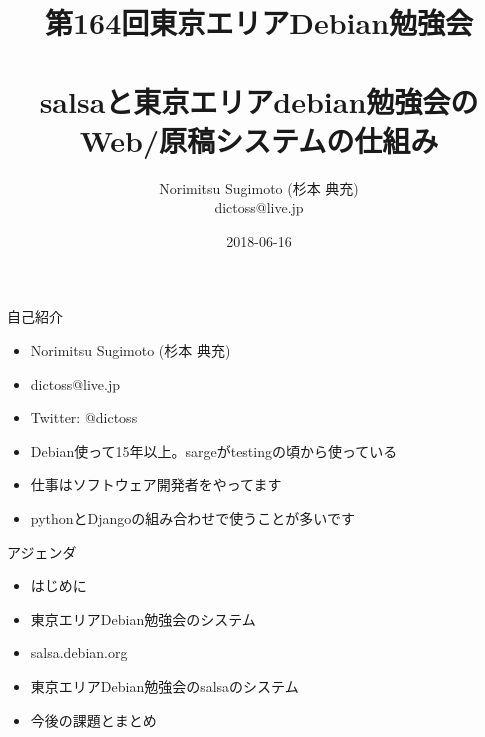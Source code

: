 \title{第164回東京エリアDebian勉強会 \\　\\salsaと東京エリアdebian勉強会の\\Web/原稿システムの仕組み}
\subtitle{}
\author{Norimitsu Sugimoto (杉本 典充) \\dictoss@live.jp}
\date{2018-06-16}



\frame{\titlepage{}}


\begin{frame}{自己紹介}
  \begin{itemize}
  \item Norimitsu Sugimoto (杉本 典充)
  \item dictoss@live.jp
  \item Twitter: @dictoss
  \item Debian使って15年以上。sargeがtestingの頃から使っている
  \item 仕事はソフトウェア開発者をやってます
  \item pythonとDjangoの組み合わせで使うことが多いです
  \end{itemize}
\end{frame}

\begin{frame}{アジェンダ}
  \begin{itemize}
  \item はじめに
  \item 東京エリアDebian勉強会のシステム
  \item salsa.debian.org
  \item 東京エリアDebian勉強会のsalsaのシステム
  \item 今後の課題とまとめ
  \end{itemize}
\end{frame}

